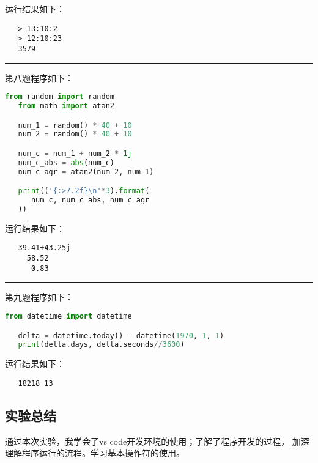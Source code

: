 \documentclass[a4paper]{ctexart}
\newcommand{\lineiin}{
   \begin{center}
      \rule{\textwidth}{0.1pt}
   \end{center}
}
\begin{document}
      运行结果如下：
      \begin{lstlisting}
   > 13:10:2
   > 12:10:23
   3579
      \end{lstlisting}

      \lineiin

      第八题程序如下：
      \begin{lstlisting}[language=python]
   from random import random
   from math import atan2

   num_1 = random() * 40 + 10
   num_2 = random() * 40 + 10

   num_c = num_1 + num_2 * 1j
   num_c_abs = abs(num_c)
   num_c_agr = atan2(num_2, num_1)

   print(('{:>7.2f}\n'*3).format(
      num_c, num_c_abs, num_c_agr
   ))
      \end{lstlisting}

      运行结果如下：
      \begin{lstlisting}
   39.41+43.25j
     58.52
      0.83

      \end{lstlisting}

      \lineiin

      第九题程序如下：
      \begin{lstlisting}[language=python]
   from datetime import datetime

   delta = datetime.today() - datetime(1970, 1, 1)
   print(delta.days, delta.seconds//3600)
      \end{lstlisting}

      运行结果如下：
      \begin{lstlisting}
   18218 13
      \end{lstlisting}

   \subsection{实验总结}
      通过本次实验，我学会了vs code开发环境的使用；了解了程序开发的过程，%
      加深理解程序运行的流程。学习基本操作符的使用。
\end{document}
